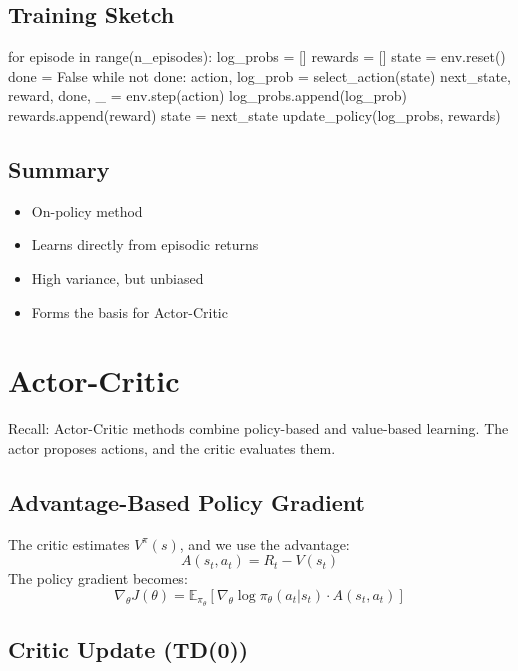 \documentclass{article}
\begin{document}
\subsection{Training Sketch}

\begin{python}
for episode in range(n_episodes):
    log_probs = []
    rewards = []
    state = env.reset()
    done = False
    while not done:
        action, log_prob = select_action(state)
        next_state, reward, done, _ = env.step(action)
        log_probs.append(log_prob)
        rewards.append(reward)
        state = next_state
    update_policy(log_probs, rewards)
\end{python}

\subsection{Summary}

\begin{itemize}
    \item On-policy method
    \item Learns directly from episodic returns
    \item High variance, but unbiased
    \item Forms the basis for Actor-Critic
\end{itemize}

\section{Actor-Critic}

Recall: Actor-Critic methods combine policy-based and value-based learning. The actor proposes actions, and the critic evaluates them.

\subsection{Advantage-Based Policy Gradient}

The critic estimates $V^\pi(s)$, and we use the advantage:
\begin{equation}
    A(s_t, a_t) = R_t - V(s_t)
\end{equation}
The policy gradient becomes:
\begin{equation}
    \nabla_\theta J(\theta) = \mathbb{E}_{\pi_\theta} \left[ \nabla_\theta \log \pi_\theta(a_t | s_t) \cdot A(s_t, a_t) \right]
\end{equation}

\subsection{Critic Update (TD(0))}
\end{document}
